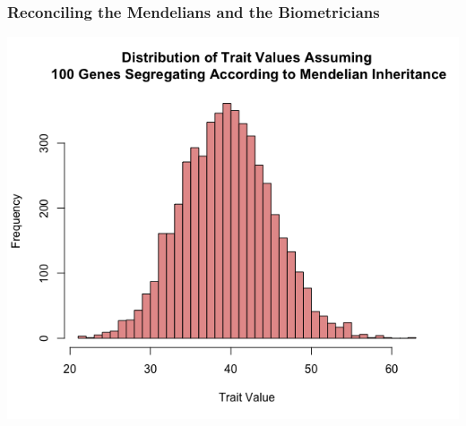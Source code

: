 \documentclass{beamer}
\begin{document}
\begin{frame}
	\frametitle{Reconciling the Mendelians and the Biometricians}

				\includegraphics[keepaspectratio, width  =\textwidth]{img/100Genes}
\end{frame}

\end{document}
